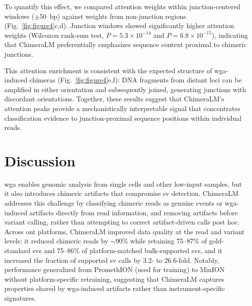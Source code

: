 \documentclass[pdflatex,lineno]{sn-jnl}%
\newif\ifrevisedtext
\newcommand{\chg}[1]{\ifrevisedtext\textcolor{revcolor}{#1}\else#1\fi}
\begin{document}
To quantify this effect, we compared attention weights within junction-centered windows ($\pm$50~bp) against weights from non-junction regions (Fig.~\ref{fig:figure4}c,d).
Junction windows showed significantly higher attention weights (Wilcoxon rank-sum test, $P = 5.3 \times 10^{-14}$ and $P = 6.8 \times 10^{-15}$), indicating that ChimeraLM preferentially emphasizes sequence context proximal to chimeric junctions.

This attention enrichment is consistent with the expected structure of \gls{wga}-induced chimeras (Fig.~\ref{fig:figure4}e,f): DNA fragments from distant loci can be amplified in either orientation and subsequently joined, generating junctions with discordant orientations.
Together, these results suggest that ChimeraLM’s attention peaks provide a mechanistically interpretable signal that concentrates classification evidence to junction-proximal sequence positions within individual reads.

\section*{Discussion}\label{sec:discussion}

\gls{wga} enables genomic analysis from single cells and other low-input samples, but it also introduces chimeric artifacts that compromise \gls{sv} detection.
ChimeraLM addresses this challenge by classifying chimeric reads as genuine events or \gls{wga}-induced artifacts directly from read information, and removing artifacts before variant calling, rather than attempting to correct artifact-driven calls post hoc.
Across \gls{ont} platforms, ChimeraLM improved data quality at the read and variant levels:
it reduced chimeric reads by \(\sim\)90\% \chg{while retaining 75--87\% of gold-standard \glspl{sv} and 75--86\% of platform-matched bulk-supported \glspl{sv}, and it increased the fraction of supported \gls{sv} calls by 3.2- to 26.6-fold}.
Notably, performance generalized from PromethION (used for training) to MinION without platform-specific retraining, suggesting that ChimeraLM captures properties shared by \gls{wga}-induced artifacts rather than instrument-specific signatures.
\end{document}
